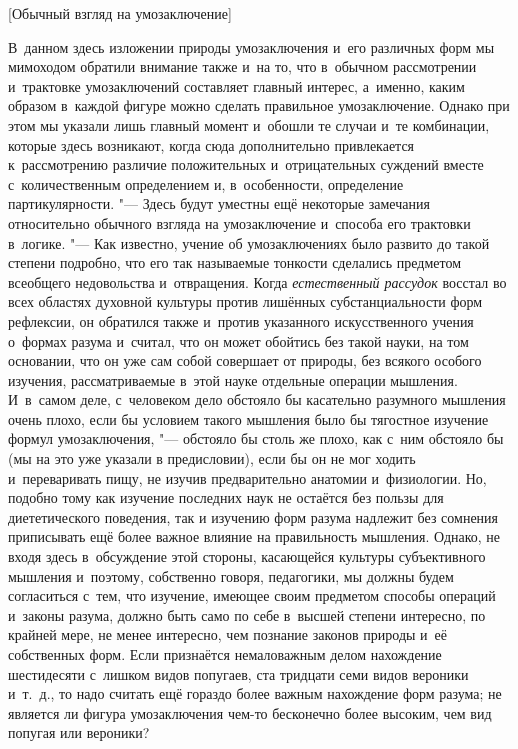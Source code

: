 %
{[Обычный взгляд на умозаключение]}

В~данном здесь изложении природы умозаключения и~его различных
форм мы мимоходом обратили внимание также и~на то, что в~обычном
рассмотрении и~трактовке умозаключений составляет главный
интерес, а~именно, каким образом в~каждой фигуре можно сделать правильное
умозаключение. Однако при этом мы указали лишь главный момент и~обошли те
случаи и~те комбинации, которые здесь возникают, когда сюда дополнительно
привлекается к~рассмотрению различие положительных и~отрицательных суждений
вместе с~количественным определением и, в~особенности, определение
партикулярности. "--- Здесь будут уместны ещё некоторые
замечания относительно обычного взгляда на умозаключение и~способа его
трактовки в~логике. "--- Как известно, учение об умозаключениях
было развито до такой степени подробно, что его так называемые тонкости
сделались предметом всеобщего недовольства и~отвращения. Когда
{\em естественный рассудок}
восстал во всех областях духовной культуры против лишённых
субстанциальности форм рефлексии, он обратился также и~против указанного
искусственного учения о~формах разума и~считал, что он может обойтись без
такой науки, на том основании, что он уже сам собой совершает от природы,
без всякого особого изучения, рассматриваемые в~этой науке отдельные
операции мышления. И~в~самом деле, с~человеком дело обстояло бы касательно
разумного мышления очень плохо, если бы условием такого мышления было бы
тягостное изучение формул умозаключения, "--- обстояло бы столь
же плохо, как с~ним обстояло бы (мы на это уже указали в
предисловии),
если бы он не мог ходить и~переваривать пищу, не изучив
предварительно анатомии и~физиологии. Но, подобно тому как изучение
последних наук не остаётся без пользы для диететического поведения, так и
изучению форм разума надлежит без сомнения приписывать ещё более важное
влияние на правильность мышления. Однако, не входя здесь в~обсуждение этой
стороны, касающейся культуры субъективного мышления и~поэтому, собственно
говоря, педагогики, мы должны будем согласиться с~тем, что изучение,
имеющее своим предметом способы операций и~законы разума, должно быть само
по себе в~высшей степени интересно, по крайней мере, не менее интересно,
чем познание законов природы и~её собственных форм. Если признаётся
немаловажным делом нахождение шестидесяти с~лишком видов попугаев, ста
тридцати семи видов вероники и~т.~д., то надо считать ещё гораздо более
важным нахождение форм разума; не является ли фигура умозаключения чем-то
бесконечно более высоким, чем вид попугая или вероники?


